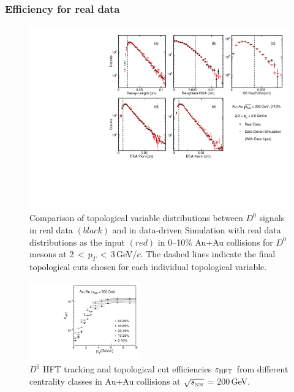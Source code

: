 \documentclass[%
 reprint,	
 amsmath,amssymb,
 aps,
 prc,
]{revtex4-1}
\begin{document}

\subsubsection{Efficiency for real data}
\label{correction:hft:fordata}

\begin{figure}
\centering
\includegraphics[width=1.0\textwidth]{fig/DataTopo.pdf}
\caption{Comparison of topological variable distributions between $D^0$ signals in real data $(black)$ and in data-driven Simulation with real data distributions as the input $(red)$ in 0--10\% Au+Au collisions for $D^0$ mesons at 2\,$<$\,$p_T$\,$<$\,3\,GeV/$c$. The dashed lines indicate the final topological cuts chosen for each individual topological variable.}
\label{fig:DataTopo} 
\end{figure}

\begin{figure}[h]
\centering
\includegraphics[width=0.43\textwidth]{fig/Datad0Eff_hftTopo_10.pdf}
\caption{$D^{0}$ HFT tracking and topological cut efficiencies $\varepsilon_{\rm HFT}$ from different centrality classes in Au+Au collisions at $\sqrt{s_{_{\rm NN}}}$ = 200\,GeV.}
\label{fig:Datad0Eff_hftTopo} 
\end{figure}
\end{document}
